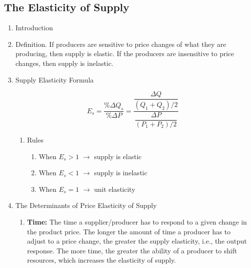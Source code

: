\subsection{The Elasticity of Supply}
\begin{enumerate}[label = \textbf{(\Alph*)}, itemsep = 1em]
	\item Introduction
	\item Definition. If producers are sensitive to price changes of what they are producing, then supply is elastic. If the producers are insensitive to price changes, then supply is inelastic.
	\item Supply Elasticity Formula

		\[ E_s = \dfrac{\%\Delta Q_s}{ \%\Delta P} = \dfrac{\dfrac{\Delta Q}{(Q_1 + Q_2)/2}}{\dfrac{\Delta P}{(P_1 + P_2)/2}}\]

		\begin{enumerate}[label = \textbf{(\arabic*)}, itemsep = 1ex]
			\item Rules
				\begin{enumerate}[label = ---, itemsep = 1ex]
					\item When $E_s > 1$ $\longrightarrow$ supply is elastic
					\item When $E_s < 1$ $\longrightarrow$ supply is inelastic	
					\item When $E_s = 1$ $\longrightarrow$ unit elasticity
				\end{enumerate}
		\end{enumerate}

			\item The Determinants of Price Elasticity of Supply
				\begin{enumerate}[label = \textbullet, itemsep = 1ex, topsep = 1ex]
					\item \textbf{Time:} The time a supplier/producer has to respond to a given change in the product price. The longer the amount of time a producer has to adjust to a price change, the greater the supply elasticity, i.e., the output response. The more time, the greater the ability of a producer to shift resources, which increases the elasticity of supply.
				\end{enumerate}
\end{enumerate}

